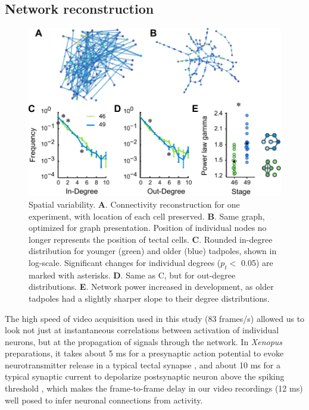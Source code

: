 \documentclass{article}
\begin{document}
\subsection*{Network reconstruction}

\begin{figure}[t]
\includegraphics[width=\linewidth]{fig4.pdf}
\caption{
Spatial variability. \textbf{A}. Connectivity reconstruction for one experiment, with location of each cell preserved. \textbf{B}. Same graph, optimized for graph presentation. Position of individual nodes no longer represents the position of tectal cells. \textbf{C}. Rounded in-degree distribution for younger (green) and older (blue) tadpoles, shown in log-scale. Significant changes for individual degrees ($p_t<$ 0.05) are marked with asterisks. \textbf{D}. Same as C, but for out-degree distributions. \textbf{E}. Network power increased in development, as older tadpoles had a slightly sharper slope to their degree distributions. }
\end{figure}

The high speed of video acquisition used in this study (83 frames/s) allowed us to look not just at instantaneous correlations between activation of individual neurons, but at the propagation of signals through the network. In \textit{Xenopus} preparations, it takes about 5 ms for a presynaptic action potential to evoke neurotransmitter release in a typical tectal synapse \citep{khakhalin2012}, and about 10 ms for a typical synaptic current to depolarize postsynaptic neuron above the spiking threshold \citep{ciarleglio2015,busch2019}, which makes the frame-to-frame delay in our video recordings (12 ms) well posed to infer neuronal connections from activity.
\end{document}
